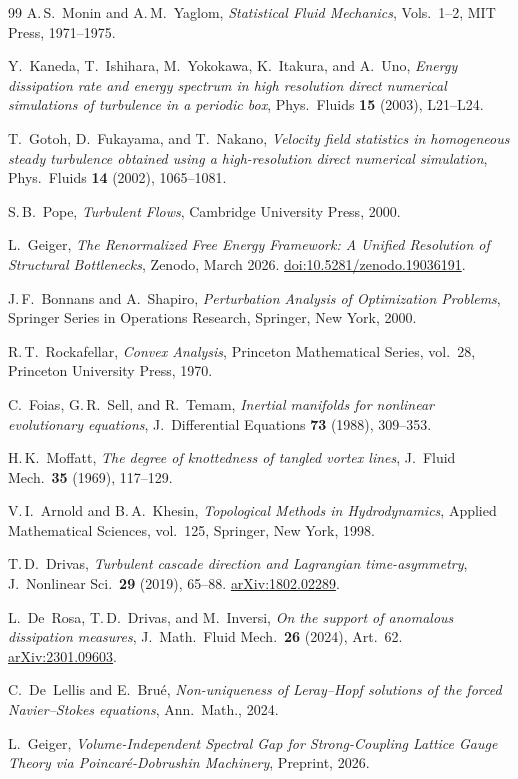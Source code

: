 \documentclass[12pt,a4paper]{article}
\theoremstyle{definition}
\theoremstyle{plain}
\theoremstyle{remark}
\begin{document}
\begin{thebibliography}{99}
A.\,S.~Monin and A.\,M.~Yaglom,
\emph{Statistical Fluid Mechanics}, Vols.~1--2,
MIT Press, 1971--1975.

Y.~Kaneda, T.~Ishihara, M.~Yokokawa, K.~Itakura, and A.~Uno,
\emph{Energy dissipation rate and energy spectrum in high resolution
direct numerical simulations of turbulence in a periodic box},
Phys.\ Fluids \textbf{15} (2003), L21--L24.

T.~Gotoh, D.~Fukayama, and T.~Nakano,
\emph{Velocity field statistics in homogeneous steady turbulence
obtained using a high-resolution direct numerical simulation},
Phys.\ Fluids \textbf{14} (2002), 1065--1081.

S.\,B.~Pope,
\emph{Turbulent Flows},
Cambridge University Press, 2000.

L.~Geiger, \emph{The Renormalized Free Energy Framework: A Unified Resolution of Structural Bottlenecks},
Zenodo, March 2026.
\href{https://doi.org/10.5281/zenodo.19036191}{doi:10.5281/zenodo.19036191}.

J.\,F.~Bonnans and A.~Shapiro,
\emph{Perturbation Analysis of Optimization Problems},
Springer Series in Operations Research, Springer, New York, 2000.

R.\,T.~Rockafellar,
\emph{Convex Analysis},
Princeton Mathematical Series, vol.~28,
Princeton University Press, 1970.

C.~Foias, G.\,R.~Sell, and R.~Temam,
\emph{Inertial manifolds for nonlinear evolutionary equations},
J.~Differential Equations \textbf{73} (1988), 309--353.

H.\,K.~Moffatt,
\emph{The degree of knottedness of tangled vortex lines},
J.~Fluid Mech.\ \textbf{35} (1969), 117--129.

V.\,I.~Arnold and B.\,A.~Khesin,
\emph{Topological Methods in Hydrodynamics},
Applied Mathematical Sciences, vol.~125,
Springer, New York, 1998.

T.\,D.~Drivas,
\emph{Turbulent cascade direction and Lagrangian time-asymmetry},
J.~Nonlinear Sci.\ \textbf{29} (2019), 65--88.
\href{https://arxiv.org/abs/1802.02289}{arXiv:1802.02289}.

L.~De~Rosa, T.\,D.~Drivas, and M.~Inversi,
\emph{On the support of anomalous dissipation measures},
J.~Math.\ Fluid Mech.\ \textbf{26} (2024), Art.~62.
\href{https://arxiv.org/abs/2301.09603}{arXiv:2301.09603}.

C.~De~Lellis and E.~Bru\'e, \textit{Non-uniqueness of Leray--Hopf solutions of the forced Navier--Stokes equations}, Ann.~Math., 2024.

L.~Geiger, \textit{Volume-Independent Spectral Gap for Strong-Coupling Lattice Gauge Theory via Poincar\'e-Dobrushin Machinery}, Preprint, 2026.

\end{thebibliography}
\end{document}

